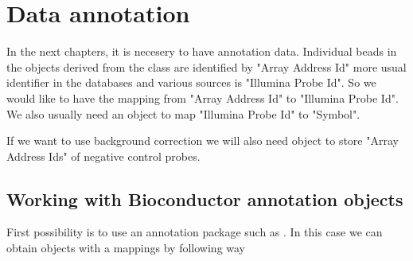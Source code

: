 \section{Data annotation}
In the next chapters, it is necesery to have annotation data. Individual beads in the objects derived from the class  are identified by "Array Address Id" more usual identifier in the databases and various sources is "Illumina Probe Id". So we would like to have the mapping from "Array Address Id" to "Illumina Probe Id". We also usually need an object to map "Illumina Probe Id" to "Symbol".

If we want to use background correction we will also need object to store "Array Address Ids" of negative control probes.

\subsection{Working with Bioconductor annotation objects}
First possibility is to use an annotation package such as . In this case we can obtain objects with a mappings by following way